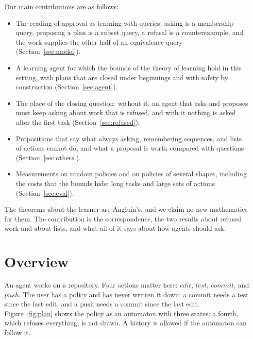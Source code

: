 \documentclass[acmsmall,nonacm,screen]{acmart}
\newcommand{\nm}[1]{\mathit{#1}}
\newcommand{\edit}{\nm{edit}}
\newcommand{\test}{\nm{test}}
\newcommand{\commit}{\nm{commit}}
\newcommand{\push}{\nm{push}}
\begin{document}
Our main contributions are as follows:
\begin{itemize}
\item The reading of approval as learning with queries: asking is a membership query,
  proposing a plan is a subset query, a refusal is a counterexample, and the work supplies
  the other half of an equivalence query (Section~\ref{sec:model}).
\item A learning agent for which the bounds of the theory of learning hold in this setting,
  with plans that are closed under beginnings and with safety by construction
  (Section~\ref{sec:agent}).
\item The place of the closing question: without it, an agent that asks and proposes must
  keep asking about work that is refused, and with it nothing is asked after the first task
  (Section~\ref{sec:refused}).
\item Propositions that say what always asking, remembering sequences, and lists of actions
  cannot do, and what a proposal is worth compared with questions
  (Section~\ref{sec:others}).
\item Measurements on \exPolicies{} random policies and on policies of several shapes,
  including the costs that the bounds hide: long tasks and large sets of actions
  (Section~\ref{sec:eval}).
\end{itemize}
The theorems about the learner are Angluin's, and we claim no new mathematics for them. The
contribution is the correspondence, the two results about refused work and about lists,
and what all of it says about how agents should ask.

\section{Overview}
\label{sec:overview}

An agent works on a repository. Four actions matter here: $\edit$, $\test$, $\commit$, and
$\push$. The user has a policy and has never written it down: a commit needs a test since
the last edit, and a push needs a commit since the last edit. Figure~\ref{fig:plan} shows the
policy as an automaton with three states; a fourth, which refuses everything, is not drawn.
A history is allowed if the automaton can follow it.
\end{document}
